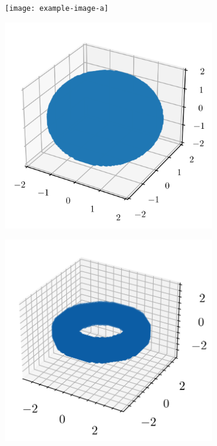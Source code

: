 \begin{figure}[h]
    \centering
    \begin{subfigure}{0.49\linewidth}
        \centering
        \texttt{[image: example-image-a]}
        \caption{}
    \end{subfigure}
    \begin{subfigure}{0.49\linewidth}
        \centering
        \includegraphics[width=1\linewidth]{figs/20/sphere_scatter.png}
        \caption{}
    \end{subfigure}
    \begin{subfigure}{0.49\linewidth}
        \centering
        \includegraphics[width=1\linewidth]{figs/20/tor_scatter.png}

\end{subfigure}
\end{figure}
